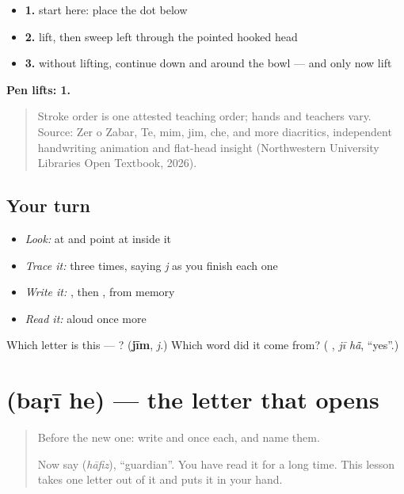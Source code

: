 \begin{itemize}
\raggedright
  \item \textbf{1.} start here: place the dot below
  \item \textbf{2.} lift, then sweep left through the pointed hooked head
  \item \textbf{3.} without lifting, continue down and around the bowl — and only now lift
\end{itemize}

\textbf{Pen lifts: 1.}

\begin{quote}
Stroke order is one attested teaching order; hands and teachers vary. Source: Zer o Zabar, Te, mim, jim, che, and more diacritics, independent  handwriting animation and flat-head insight (Northwestern University Libraries Open Textbook, 2026).
\end{quote}

\subsection*{Your turn}
\begin{itemize}
\raggedright
  \item \emph{Look:} at \textbf{ } and point at  inside it
  \item \emph{Trace it:}  three times, saying \emph{j} as you finish each one
  \item \emph{Write it:} , then , from memory
  \item \emph{Read it:} \textbf{ } aloud once more
\end{itemize}

\begin{tcolorbox}[breakable,colback=teal!4,colframe=teal!35!black,title={Before you move on}]
Which letter is this — ? (\textbf{jīm}, \emph{j}.) Which word did it come from? (\textbf{ }, \emph{jī hā̃}, \textquotedblleft{}yes\textquotedblright{}.)
\end{tcolorbox}
\section[\texorpdfstring{\ur{ح} (baṛī he)}{ح (baṛī he)}]{ (baṛī he) — the letter that opens }

\label{lesson:UR-W35-bari-he}



\begin{quote}
Before the new one: write  and  once each, and name them.

Now say \textbf{} (\emph{hāfiz}), \textquotedblleft{}guardian\textquotedblright{}. You have read it for a long time. This lesson takes one letter out of it and puts it in your hand.
\end{quote}

